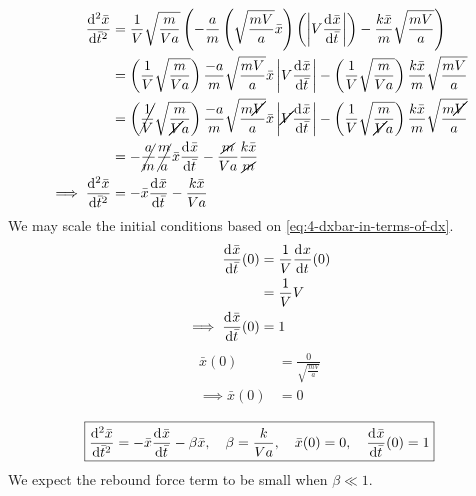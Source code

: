 \documentclass[12pt,twoside]{article}
\begin{document}
\begin{equation*}
  \begin{aligned}
    \od[2]{\bar{x}}{\bar{t}} &= \frac{1}{V}\sqrt{\frac{m}{Va}} \left(
    -\frac{a}{m}\left( \sqrt{\frac{mV}{a}}\bar{x}\right) \left(
    \abs{V\od{\bar{x}}{\bar{t}}}\right) -
    \frac{k\bar{x}}{m}\sqrt{\frac{mV}{a}}\right) \\
    &= \left(\frac{1}{V}\sqrt{\frac{m}{Va}}\right)\frac{-a}{m}\sqrt{\frac{mV}{a}}\bar{x}
    \abs{V\od{\bar{x}}{\bar{t}}} -
    \left(\frac{1}{V}\sqrt{\frac{m}{Va}}\right)\frac{k\bar{x}}{m}\sqrt{\frac{mV}{a}} \\
    &= \left(\cancel{\frac{1}{V}}\sqrt{\frac{m}{\cancel{V}a}}\right)\frac{-a}{m}\sqrt{\frac{m\cancel{V}}{a}}\bar{x}
    \abs{\cancel{V}\od{\bar{x}}{\bar{t}}} -
    \left(\frac{1}{V}\sqrt{\frac{m}{\cancel{V}a}}\right)\frac{k\bar{x}}{m}\sqrt{\frac{m\cancel{V}}{a}} \\
    &= -\cancel{\frac{a}{m}}\cancel{\frac{m}{a}}\bar{x}\od{\bar{x}}{\bar{t}} -
    \frac{\cancel{m}}{Va}\frac{k\bar{x}}{\cancel{m}} \\
    \implies \od[2]{\bar{x}}{\bar{t}} &= -\bar{x}\od{\bar{x}}{\bar{t}} - \frac{k\bar{x}}{Va} \\
  \end{aligned}
\end{equation*}
We may scale the initial conditions based on \cref{eq:4-dxbar-in-terms-of-dx}.
\begin{equation*}
  \begin{aligned}
    \od{\bar{x}}{\bar{t}}(0) &= \frac{1}{V}\od{x}{t}(0) \\
     &= \frac{1}{V}V \\
    \implies \od{\bar{x}}{\bar{t}}(0) &= 1 \\
  \end{aligned}
\end{equation*}
\begin{equation}
  \begin{aligned}
    \bar{x}(0) &= \frac{0}{\sqrt{\frac{mV}{a}}} \\
    \implies \bar{x}(0) &= 0 \\
  \end{aligned}
\end{equation}
\begin{equation*} \boxed{
    \od[2]{\bar{x}}{\bar{t}} = -\bar{x}\od{\bar{x}}{\bar{t}} - \beta\bar{x},
    \quad\beta=\frac{k}{Va},\quad \bar{x}(0)=0,
    \quad\od{\bar{x}}{\bar{t}}(0) = 1
  }
\end{equation*}
We expect the rebound force term to be small when $\beta\ll 1$.
\end{document}
